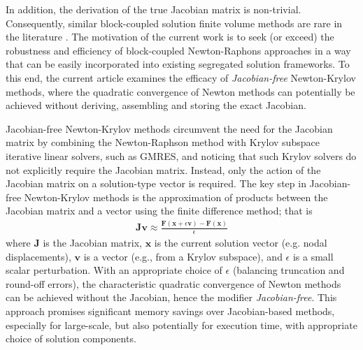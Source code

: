 \documentclass[sn-mathphys,Numbered]{sn-jnl}%
\newcommand{\bb}{\boldsymbol}
\begin{document}
In addition, the derivation of the true Jacobian matrix is non-trivial.
Consequently, similar block-coupled solution finite volume methods are rare in the literature \citep{Das2011, Cardiff2016, Castrillo2024}.
The motivation of the current work is to seek (or exceed) the robustness and efficiency of block-coupled Newton-Raphons approaches in a way that can be easily incorporated into existing segregated solution frameworks.
To this end, the current article examines the efficacy of \emph{Jacobian-free} Newton-Krylov methods, where the quadratic convergence of Newton methods can potentially be achieved without deriving, assembling and storing the exact Jacobian.

Jacobian-free Newton-Krylov methods circumvent the need for the Jacobian matrix by combining the Newton-Raphson method with Krylov subspace iterative linear solvers, such as GMRES, and noticing that such Krylov solvers do not explicitly require the Jacobian matrix.
Instead, only the action of the Jacobian matrix on a solution-type vector is required.
The key step in Jacobian-free Newton-Krylov methods is the approximation of products between the Jacobian matrix and a vector using the finite difference method; that is
\begin{eqnarray}
	\bb{J} \bb{v} \approx \frac{\bb{F}(\bb{x} + \epsilon \bb{v}) - \bb{F}(\bb{x})}{\epsilon}
\end{eqnarray}
where $\mathbf{J}$ is the Jacobian matrix, $\mathbf{x}$ is the current solution vector (e.g. nodal displacements), $\mathbf{v}$ is a vector (e.g., from a Krylov subspace), and $\epsilon$ is a small scalar perturbation.
With an appropriate choice of $\epsilon$ (balancing truncation and round-off errors), the characteristic quadratic convergence of Newton methods can be achieved without the Jacobian, hence the modifier \emph{Jacobian-free}.
This approach promises significant memory savings over Jacobian-based methods, especially for large-scale, but also potentially for execution time, with appropriate choice of solution components.
\end{document}
